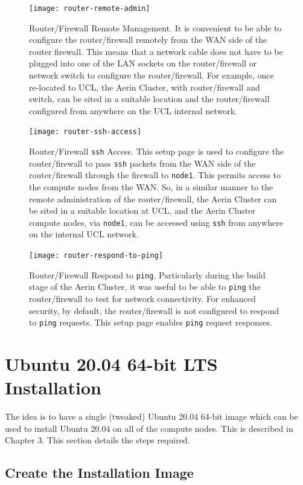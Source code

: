 \documentclass{report}
\begin{document}
\begin{figure}[H]
	\centering	
	\texttt{[image: router-remote-admin]}
	\caption{Router/Firewall Remote Management. It is convenient to be able to configure the router/firewall remotely from the WAN side of the router firewall. This means that a network cable does not have to be plugged into one of the LAN sockets on the router/firewall or network switch to configure the router/firewall. For example, once re-located to UCL, the Aerin Cluster, with router/firewall and switch, can be sited in a suitable location and the router/firewall configured from anywhere on the UCL internal network.}
\end{figure}

\begin{figure}[H]
	\centering	
	\texttt{[image: router-ssh-access]}
	\caption{Router/Firewall \texttt{ssh} Access. This setup page is used to configure the router/firewall to pass \texttt{ssh} packets from the WAN side of the router/firewall through the firewall to \texttt{node1}. This permits access to the compute nodes from the WAN. So, in a similar manner to the remote administration of the router/firewall, the Aerin Cluster can be sited in a suitable location at UCL, and the Aerin Cluster compute nodes, via \texttt{node1}, can be accessed using \texttt{ssh} from anywhere on the internal UCL network.}
\end{figure}

\begin{figure}[H]
	\centering	
	\texttt{[image: router-respond-to-ping]}
	\caption{Router/Firewall Respond to \texttt{ping}. Particularly during the build stage of the Aerin Cluster, it was useful to be able to \texttt{ping} the router/firewall to test for network connectivity. For enhanced security, by default, the router/firewall is not configured to respond to \texttt{ping} requests. This setup page enables \texttt{ping} request responses.}
\end{figure}


%
%
\section{Ubuntu 20.04 64-bit LTS Installation}

The idea is to have a single (tweaked) Ubuntu 20.04 64-bit image which can be used to install Ubuntu 20.04 on all of the compute nodes. This is described in Chapter 3. This section details the steps required.


%
%
\subsection{Create the Installation Image}
\end{document}
